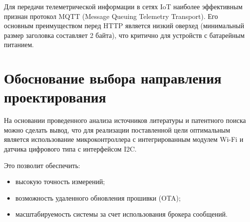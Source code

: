 Для передачи телеметрической информации в сетях IoT наиболее эффективным признан протокол MQTT (Message Queuing Telemetry Transport). Его основным преимуществом перед HTTP является низкий оверхед (минимальный размер заголовка составляет 2 байта), что критично для устройств с батарейным питанием.

\section{Обоснование выбора направления проектирования}

На основании проведенного анализа источников литературы и патентного поиска можно сделать вывод, что для реализации поставленной цели оптимальным является использование микроконтроллера с интегрированным модулем Wi-Fi и датчика цифрового типа с интерфейсом I2C. 

Это позволит обеспечить:
\begin{itemize}
    \item высокую точность измерений;
    \item возможность удаленного обновления прошивки (OTA);
    \item масштабируемость системы за счет использования брокера сообщений.
\end{itemize}

\newpage